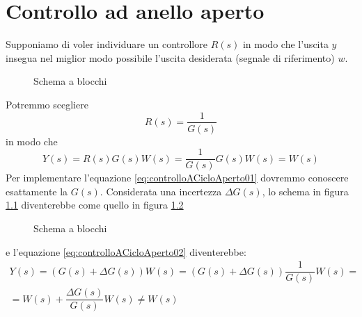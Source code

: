 \documentclass[a4paper]{report}
\begin{document}
\chapter{Controllo ad anello aperto}
Supponiamo di voler individuare un controllore $R(s)$ in modo che
l'uscita $y$ insegua nel miglior modo possibile l'uscita desiderata
(segnale di riferimento) $w$.
\begin{figure}[!hbp]
  \center
  \caption{Schema a blocchi}
  \label{fig:controlloACicloAperto01}
\end{figure}
Potremmo scegliere
\begin{equation}\label{eq:controlloACicloAperto01}
  R(s) = \dfrac{1}{G(s)}
\end{equation}
in modo che
\begin{equation}\label{eq:controlloACicloAperto02}
  Y(s) = R(s) G(s) W(s) = \dfrac{1}{G(s)} G(s) W(s) = W(s)
\end{equation}
Per implementare l'equazione \ref{eq:controlloACicloAperto01} dovremmo
conoscere esattamente la $G(s)$. Considerata una incertezza $\Delta
G(s)$, lo schema in figura \ref{fig:controlloACicloAperto01}
diventerebbe come quello in figura \ref{fig:controlloACicloAperto02}
\begin{figure}[!hbp]
  \center
  \caption{Schema a blocchi}
  \label{fig:controlloACicloAperto02}
\end{figure}
e l'equazione \ref{eq:controlloACicloAperto02} diventerebbe:
\begin{equation}\label{eq:controlloACicloAperto03}
  \begin{array}{l}
  Y(s) = (G(s) + \Delta G(s)) W(s) = (G(s) + \Delta G(s))
  \dfrac{1}{G(s)} W(s) = \\
  = W(s) + \dfrac{\Delta G(s)}{G(s)} W(s) \neq W(s)
  \end{array}
\end{equation}
\end{document}
